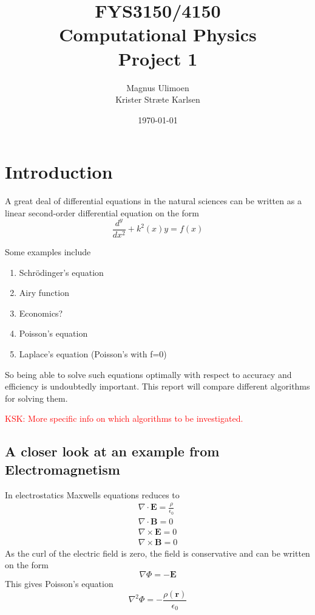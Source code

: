 \documentclass[11pt,a4paper,english,final]{article}
\title{FYS3150/4150\\Computational Physics\\Project 1}
\author{Magnus Ulimoen\\Krister Stræte Karlsen}
\date{\today}
\numberwithin{equation}{section}
\newcommand{\ve}[1]{\mathbf{#1}} %
\begin{document}
\maketitle

\section{Introduction}

A great deal of differential equations in the natural sciences can be written 
as a linear second-order differential equation on the form
\begin{equation}
\frac{d^y}{dx^2} + k^2(x)y = f(x)
\label{eq:2orderDIFF}
\end{equation}


Some examples include
\begin{enumerate}[label=\bfseries \Roman*]
\item Schrödinger's equation
\item Airy function
\item Economics?
\item Poisson's equation
\item Laplace's equation (Poisson's with f=0)
\end{enumerate}

So being able to solve such equations optimally with respect to accuracy 
and efficiency is undoubtedly important. This report will compare 
different algorithms for solving them.

\textcolor{red}{KSK: More specific info on which algorithms to be investigated. }  	


\subsection{A closer look at an example from Electromagnetism}

In electrostatics Maxwells equations reduces to
\begin{gather}
\nabla \cdot \ve{E} = \frac{\rho}{\epsilon_0}\\
\nabla \cdot \ve{B} = 0\\
\nabla \times \ve{E} = 0\\
\nabla \times \ve{B} = 0
\end{gather}
As the curl of the electric field is zero, the field is conservative
and can be written on the form
\begin{equation}
\nabla \Phi = -\ve{E}
\end{equation}
This gives Poisson's equation
\begin{equation}
\nabla^2\Phi = -\frac{\rho(\ve{r})}{\epsilon_0}
\end{equation}
\end{document}
